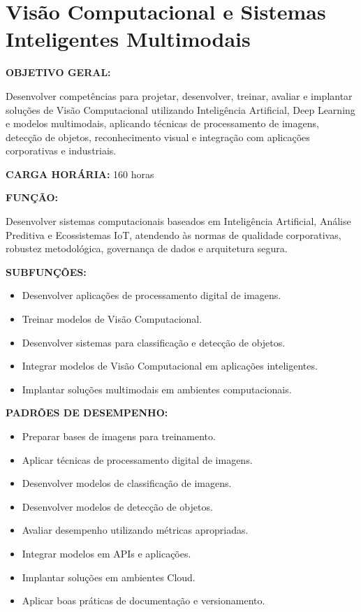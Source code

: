 \section{Visão Computacional e Sistemas Inteligentes Multimodais}

\textbf{OBJETIVO GERAL:}

Desenvolver competências para projetar, desenvolver, treinar, avaliar e implantar soluções de Visão Computacional utilizando Inteligência Artificial, Deep Learning e modelos multimodais, aplicando técnicas de processamento de imagens, detecção de objetos, reconhecimento visual e integração com aplicações corporativas e industriais.

\textbf{CARGA HORÁRIA:} 160 horas

\textbf{FUNÇÃO:}

Desenvolver sistemas computacionais baseados em Inteligência Artificial, Análise Preditiva e Ecossistemas IoT, atendendo às normas de qualidade corporativas, robustez metodológica, governança de dados e arquitetura segura.

\textbf{SUBFUNÇÕES:}

\begin{itemize}
\item Desenvolver aplicações de processamento digital de imagens.
\item Treinar modelos de Visão Computacional.
\item Desenvolver sistemas para classificação e detecção de objetos.
\item Integrar modelos de Visão Computacional em aplicações inteligentes.
\item Implantar soluções multimodais em ambientes computacionais.
\end{itemize}

\textbf{PADRÕES DE DESEMPENHO:}

\begin{itemize}
\item Preparar bases de imagens para treinamento.
\item Aplicar técnicas de processamento digital de imagens.
\item Desenvolver modelos de classificação de imagens.
\item Desenvolver modelos de detecção de objetos.
\item Avaliar desempenho utilizando métricas apropriadas.
\item Integrar modelos em APIs e aplicações.
\item Implantar soluções em ambientes Cloud.
\item Aplicar boas práticas de documentação e versionamento.
\end{itemize}

